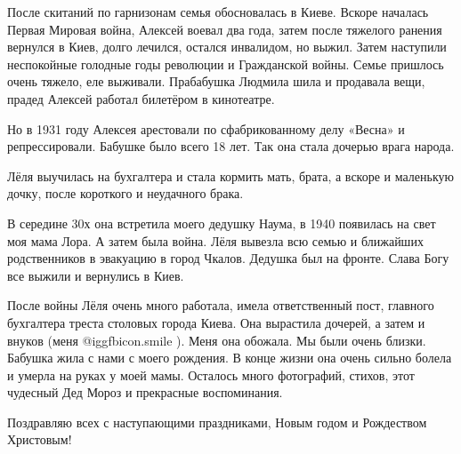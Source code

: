 После скитаний по гарнизонам семья обосновалась в Киеве. Вскоре началась Первая
Мировая война, Алексей воевал два года, затем после тяжелого ранения вернулся в
Киев, долго лечился, остался инвалидом, но выжил. Затем наступили неспокойные
голодные годы революции и Гражданской войны. Семье пришлось очень тяжело, еле
выживали. Прабабушка Людмила шила и продавала вещи, прадед Алексей работал
билетёром в кинотеатре.

Но в 1931 году Алексея арестовали по сфабрикованному делу «Весна» и
репрессировали. Бабушке было всего 18 лет. Так она стала дочерью врага народа. 

Лёля выучилась на бухгалтера и стала кормить мать, брата, а вскоре и маленькую
дочку, после короткого и неудачного брака.

В середине 30х она встретила моего дедушку Наума, в 1940 появилась на свет моя
мама Лора. А затем была война. Лёля вывезла всю семью и ближайших родственников
в эвакуацию в город Чкалов. Дедушка был на фронте. Слава Богу все выжили и
вернулись в Киев.

После войны Лёля очень много работала, имела ответственный пост, главного
бухгалтера треста столовых города Киева. Она вырастила дочерей, а затем и
внуков (меня  @igg{fbicon.smile} ). Меня она обожала. Мы были очень близки. Бабушка жила с нами с
моего рождения. В конце жизни она очень сильно болела и умерла на руках у моей
мамы. Осталось много фотографий, стихов, этот чудесный Дед Мороз и прекрасные
воспоминания.

Поздравляю всех с наступающими праздниками, Новым годом и Рождеством Христовым!
